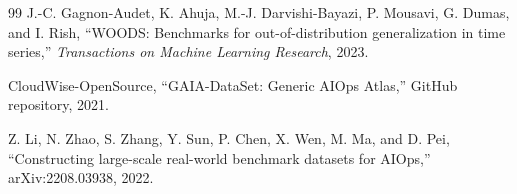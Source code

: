\documentclass[conference]{IEEEtran}
\begin{document}
\begin{thebibliography}{99}
J.-C. Gagnon-Audet, K. Ahuja, M.-J. Darvishi-Bayazi, P. Mousavi, G. Dumas, and I. Rish, ``WOODS: Benchmarks for out-of-distribution generalization in time series,'' \emph{Transactions on Machine Learning Research}, 2023.

CloudWise-OpenSource, ``GAIA-DataSet: Generic AIOps Atlas,'' GitHub repository, 2021.

Z. Li, N. Zhao, S. Zhang, Y. Sun, P. Chen, X. Wen, M. Ma, and D. Pei, ``Constructing large-scale real-world benchmark datasets for AIOps,'' arXiv:2208.03938, 2022.

\end{thebibliography}
\end{document}
